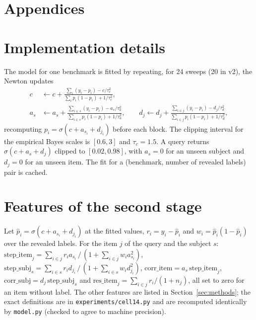 \documentclass{article}
\begin{document}
\appendix
\newpage
\section*{Appendices}
\section{Implementation details}
\label{app:impl}
The model for one benchmark is fitted by repeating, for 24 sweeps (20 in v2), the Newton updates
\begin{align*}
c &\leftarrow c + \frac{\sum_i (y_i - p_i) - c/\tau_c^2}{\sum_i p_i(1-p_i) + 1/\tau_c^2},\\
a_s &\leftarrow a_s + \frac{\sum_{i\in s}(y_i - p_i) - a_s/\tau_a^2}{\sum_{i\in s}p_i(1-p_i) + 1/\tau_a^2},\qquad
d_j \leftarrow d_j + \frac{\sum_{i\in j}(y_i - p_i) - d_j/\tau_d^2}{\sum_{i\in j}p_i(1-p_i) + 1/\tau_d^2},
\end{align*}
recomputing $p_i=\sigma(c+a_{s_i}+d_{j_i})$ before each block. The clipping interval for the empirical Bayes scales is $[0.6,3]$ and $\tau_c=1.5$. A query returns $\sigma(c + a_s + d_j)$ clipped to $[0.02,0.98]$, with $a_s=0$ for an unseen subject and $d_j=0$ for an unseen item. The fit for a (benchmark, number of revealed labels) pair is cached.

\section{Features of the second stage}
\label{app:feat}
Let $\hat p_i=\sigma(c+a_{s_i}+d_{j_i})$ at the fitted values, $r_i=y_i-\hat p_i$ and $w_i=\hat p_i(1-\hat p_i)$ over the revealed labels. For the item $j$ of the query and the subject $s$: $\text{step\_item}_j=\sum_{i\in j} r_i a_{s_i}\,/\,(1+\sum_{i\in j} w_i a_{s_i}^2)$, $\text{step\_subj}_s=\sum_{i\in s} r_i d_{j_i}\,/\,(1+\sum_{i\in s} w_i d_{j_i}^2)$, $\text{corr\_item}=a_s\,\text{step\_item}_j$, $\text{corr\_subj}=d_j\,\text{step\_subj}_s$ and $\text{res\_item}_j=\sum_{i\in j} r_i/(1+n_j)$, all set to zero for an item without label. The other features are listed in Section~\ref{sec:methods}; the exact definitions are in \texttt{experiments/cell14.py} and are recomputed identically by \texttt{model.py} (checked to agree to machine precision).
\end{document}

